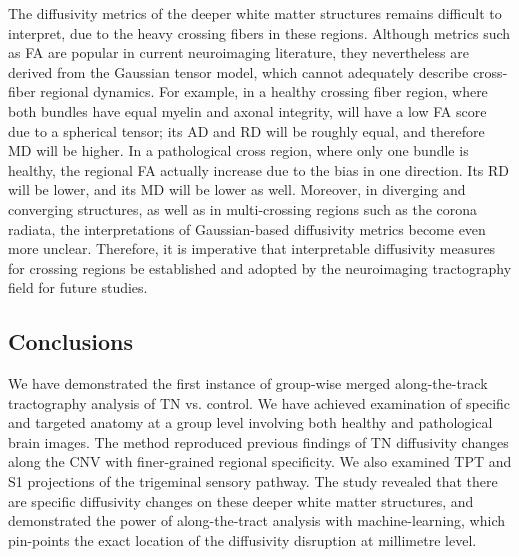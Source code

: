 The diffusivity metrics of the deeper white matter structures remains difficult to interpret, due to the heavy crossing fibers in these regions. Although metrics such as FA are popular in current neuroimaging literature, they nevertheless are derived from the Gaussian tensor model, which cannot adequately describe cross-fiber regional dynamics. For example, in a healthy crossing fiber region, where both bundles have equal myelin and axonal integrity, will have a low FA score due to a spherical tensor; its AD and RD will be roughly equal, and therefore MD will be higher. In a pathological cross region, where only one bundle is healthy, the regional FA actually increase due to the bias in one direction. Its RD will be lower, and its MD will be lower as well. Moreover, in diverging and converging structures, as well as in multi-crossing regions such as the corona radiata, the interpretations of Gaussian-based diffusivity metrics become even more unclear. Therefore, it is imperative that interpretable diffusivity measures for crossing regions be established and adopted by the neuroimaging tractography field for future studies. 

\subsection{Conclusions}
We have demonstrated the first instance of group-wise merged along-the-track tractography analysis of TN vs. control. We have achieved examination of specific and targeted anatomy at a group level involving both healthy and pathological brain images. The method reproduced previous findings of TN diffusivity changes along the CNV with finer-grained regional specificity. We also examined TPT and S1 projections of the trigeminal sensory pathway. The study revealed that there are specific diffusivity changes on these deeper white matter structures, and demonstrated the power of along-the-tract analysis with machine-learning, which pin-points the exact location of the diffusivity disruption at millimetre level. 
